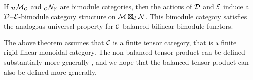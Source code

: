\documentclass{amsart}
\begin{document}
\begin{remark}
	If ${}_{\mathcal D}\mathcal M_{\mathcal C}$ and ${}_{\mathcal C}\mathcal N_{\mathcal E}$ are bimodule categories, then the actions of $\mathcal D$ and $\mathcal E$ induce a $\mathcal D$--$\mathcal E$-bimodule category structure on $\mathcal M \boxtimes_{\mathcal C} \mathcal N$. This bimodule category satisfies the analogous universal property for $\mathcal C$-balanced bilinear bimodule functors.
\end{remark}

\begin{remark}
The above theorem assumes that $\mathcal C$ is a finite tensor category, that is a finite rigid linear monoidal category.  The non-balanced tensor product can be defined substantially more generally \cite{1212.1545}, and we hope that the balanced tensor product can also be defined more generally.
\end{remark}




\end{document}
